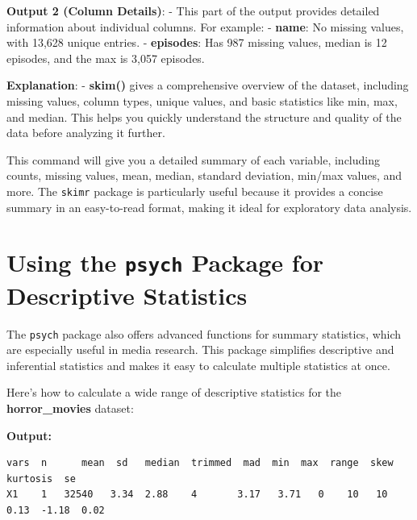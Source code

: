 \documentclass[
]{book}
\newenvironment{Shaded}{\begin{snugshade}}{\end{snugshade}}
\newcommand{\CommentTok}[1]{\textcolor[rgb]{0.56,0.35,0.01}{\textit{#1}}}
\newcommand{\FunctionTok}[1]{\textcolor[rgb]{0.13,0.29,0.53}{\textbf{#1}}}
\newcommand{\NormalTok}[1]{#1}
\newcommand{\SpecialCharTok}[1]{\textcolor[rgb]{0.81,0.36,0.00}{\textbf{#1}}}
\begin{document}
\textbf{Output 2 (Column Details)}:
- This part of the output provides detailed information about individual columns. For example:
- \textbf{name}: No missing values, with 13,628 unique entries.
- \textbf{episodes}: Has 987 missing values, median is 12 episodes, and the max is 3,057 episodes.

\textbf{Explanation}:
- \textbf{skim()} gives a comprehensive overview of the dataset, including missing values, column types, unique values, and basic statistics like min, max, and median. This helps you quickly understand the structure and quality of the data before analyzing it further.

This command will give you a detailed summary of each variable, including counts, missing values, mean, median, standard deviation, min/max values, and more. The \texttt{skimr} package is particularly useful because it provides a concise summary in an easy-to-read format, making it ideal for exploratory data analysis.

\section{\texorpdfstring{Using the \texttt{psych} Package for Descriptive Statistics}{Using the psych Package for Descriptive Statistics}}\label{using-the-psych-package-for-descriptive-statistics}

The \texttt{psych} package also offers advanced functions for summary statistics, which are especially useful in media research. This package simplifies descriptive and inferential statistics and makes it easy to calculate multiple statistics at once.

Here's how to calculate a wide range of descriptive statistics for the \textbf{horror\_movies} dataset:

\begin{Shaded}
\end{Shaded}

\textbf{Output:}

\begin{verbatim}
vars  n      mean  sd   median  trimmed  mad  min  max  range  skew  kurtosis  se
X1    1   32540   3.34  2.88    4       3.17   3.71   0    10   10   0.13  -1.18  0.02
\end{verbatim}
\end{document}
